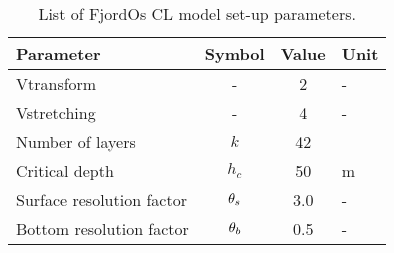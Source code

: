 \begin{table}[t]
 \begin{center}
  \caption{List of FjordOs CL model set-up parameters.}
   \begin{tabular}{lccl}
   \hline
    Parameter				& Symbol	& Value	& Unit		\\
   \hline
    Vtransform				& -		& 2 	& -		\\
    Vstretching 			& -		& 4	& -		\\
    Number of layers			& $k$ 		& 42 \\
    Critical depth			& $h_c$		& 50	& m		\\
    Surface resolution factor		& $\theta_s$	& 3.0	& -		\\
    Bottom resolution factor		& $\theta_b$	& 0.5	& -		\\
   \hline
   \end{tabular}
  \label{tab:parameters}
 \end{center}
\end{table} 

